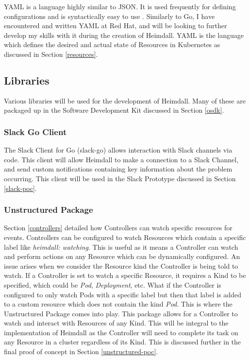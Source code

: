 \documentclass{article}
\begin{document}
YAML is a language highly similar to JSON. It is used frequently for defining configurations and is syntactically easy to use \cite{yaml-blog}. Similarly to Go, I have encountered and written YAML at Red Hat, and will be looking to further develop my skills with it during the creation of Heimdall. YAML is the language which defines the desired and actual state of Resources in Kubernetes as discussed in Section \ref{resources}. 

\subsection{Libraries}

Various libraries will be used for the development of Heimdall. Many of these are packaged up in the Software Development Kit discussed in Section \ref{osdk}. 


\subsubsection{Slack Go Client}

The Slack Client for Go (slack-go) allows interaction with Slack channels via code. This client will allow Heimdall to make a connection to a Slack Channel, and send custom notifications containing key information about the problem occurring. This client will be used in the Slack Prototype discussed in Section \ref{slack-poc}.

\subsubsection{Unstructured Package}

Section \ref{controllers} detailed how Controllers can watch specific resources for events. Controllers can be configured to watch Resources which contain a specific label like \emph{heimdall: watching}. This is useful as it means a Controller can watch and perform actions on any Resource which can be dynamically configured. An issue arises when we consider the Resource kind the Controller is being told to watch. If a Controller is set to watch a specific Resource, it requires a Kind to be specified, which could be \emph{Pod}, \emph{Deployment}, etc. What if the Controller is configured to only watch Pods with a specific label but then that label is added to a custom resource which does not contain the kind \emph{Pod}. This is where the Unstructured Package comes into play. This package allows for a Controller to watch and interact with Resources of any Kind. This will be integral to the implementation of Heimdall as the Controller will need to complete its task on any Resource in a cluster regardless of its Kind. This is discussed further in the final proof of concept in Section \ref{unstructured-poc}.
\end{document}
